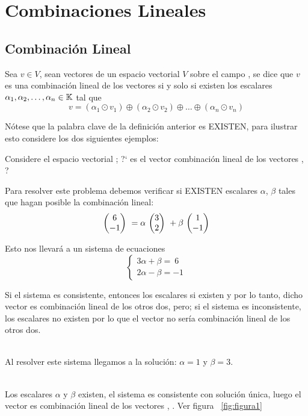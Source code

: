 \chapter{Combinaciones Lineales}

\section{Combinación Lineal}
\begin{dfn}
Sea $v\in V$, sean  vectores de un espacio vectorial $V$ sobre el campo \doblek , se dice que $v$ es una combinación lineal de los vectores  si y solo si existen los escalares $\alpha_1, \alpha_2, \ldots, \alpha_n \in \mathbb{K}$ tal que 
\[
v=\left(\alpha_1\odot v_1\right)\oplus
\left(\alpha_2\odot v_2\right)\oplus
\ldots \oplus
\left(\alpha_n\odot v_n\right)
\]
\end{dfn}
Nótese que la palabra clave de la definición anterior es EXISTEN, para ilustrar esto considere los
dos siguientes ejemplos:
\begin{ejemplo}
Considere el espacio vectorial \rdos; ?` es el vector  combinación lineal de los vectores , ?
\end{ejemplo}

Para resolver este problema debemos verificar si EXISTEN escalares $\alpha$, $\beta$ tales que hagan posible la combinación lineal:
\[\mbox{ \ensuremath{\begin{pmatrix} 6\\ -1\\ \end{pmatrix} } } =\alpha\mbox{ \ensuremath{\begin{pmatrix} 3\\ 2\\ \end{pmatrix} } }+\beta\mbox{ \ensuremath{\begin{pmatrix} 1\\ -1\\ \end{pmatrix} } }\]

Esto nos llevar\'a a un sistema de ecuaciones
\[
\left\{
\begin{array}{l}
3\alpha+\beta=\ 6\\
2\alpha-\beta=-1
\end{array}
\right.
\]

Si el sistema es consistente, entonces los escalares si existen y por lo tanto, dicho vector es combinación lineal de los otros dos, pero; si el sistema es inconsistente, los escalares no existen
por lo que el vector no sería combinación lineal de los otros dos.

~\\
Al resolver este sistema llegamos a la solución:
$\alpha=1$ y $\beta=3$.

~\\
Los escalares $\alpha$ y $\beta$ existen, el sistema es consistente con solución \'unica, luego el vector  es combinación lineal de los vectores , . Ver figura ~\ref{fig:figura1}

